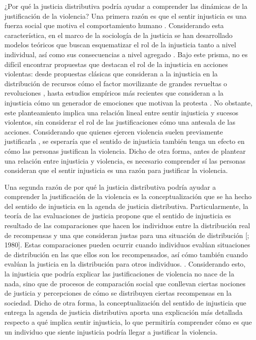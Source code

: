 \documentclass[12pt,twoside]{templates/facsothesis}
\begin{document}
¿Por qué la justicia distributiva podría ayudar a comprender las dinámicas de la justificación de la violencia? Una primera razón es que el sentir injusticia es una fuerza social que motiva el comportamiento humano \citep{Liebig2016}. Considerando esta característica, en el marco de la sociología de la justicia se han desarrollado modelos teóricos que buscan esquematizar el rol de la injusticia tanto a nivel individual, así como sus consecuencias a nivel agregado \citep[e.g.][]{Liebig2016}. Bajo este prisma, no es difícil encontrar propuestas que destacan el rol de la injusticia en acciones violentas: desde propuestas clásicas que consideran a la injusticia en la distribución de recursos cómo el factor movilizante de grandes revueltas o revoluciones \citep[e.g.][\citet{Gurr1970}, \citet{Jasso1980}]{BarringtonMoore1978}, hasta estudios empíricos más recientes que consideran a la injusticia cómo un generador de emociones que motivan la protesta \citep[e.g.][]{Agostini2021, Tausch2011}. No obstante, este planteamiento implica una relación lineal entre sentir injusticia y sucesos violentos, sin considerar el rol de las justificaciones cómo una antesala de las acciones. Considerando que quienes ejercen violencia suelen previamente justificarla \citep{Nunes2021, Kalmoe2014}, se esperaría que el sentido de injusticia también tenga un efecto en cómo las personas justifican la violencia. Dicho de otra forma, antes de plantear una relación entre injusticia y violencia, es necesario comprender sí las personas consideran que el sentir injusticia es una razón para justificar la violencia.

Una segunda razón de por qué la justicia distributiva podría ayudar a comprender la justificación de la violencia es la conceptualización que se ha hecho del sentido de injusticia en la agenda de justicia distributiva. Particularmente, la teoría de las evaluaciones de justicia propone que el sentido de injusticia es resultado de las comparaciones que hacen los individuos entre la distribución real de recompensas y una que consideran justas para una situación de distribución {[}\citet{Jasso1978}; 1980{]}. Estas comparaciones pueden ocurrir cuando individuos evalúan situaciones de distribución en las que ellos son los recompensados, así cómo también cuando evalúan la justicia en la distribución para otros individuos. \citep{Jasso2015}. Considerando esto, la injusticia que podría explicar las justificaciones de violencia no nace de la nada, sino que de procesos de comparación social que conllevan ciertas nociones de justicia y percepciones de cómo se distribuyen ciertas recompensas en la sociedad. Dicho de otra forma, la conceptualización del sentido de injusticia que entrega la agenda de justicia distributiva aporta una explicación más detallada respecto a qué implica sentir injusticia, lo que permitiría comprender cómo es que un individuo que siente injusticia podría llegar a justificar la violencia.
\end{document}

